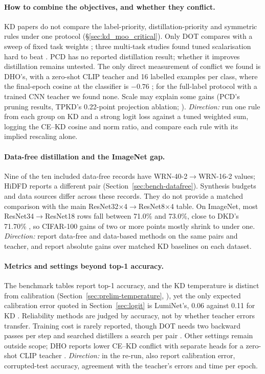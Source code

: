 \paragraph{How to combine the objectives, and whether they conflict.}
KD papers do not compare the label-priority, distillation-priority and symmetric rules under one protocol (\S\ref{sec:kd_moo_critical}). Only DOT compares with a sweep of fixed task weights \citep{zhao2023dot}; three multi-task studies found tuned scalarisation hard to beat
\citep{xin2022mtohelp,kurin2022unitary,royer2023scalarization}. PCD \citep{varam2026pcd} has no reported
distillation result; whether it improves distillation remains untested. The only direct measurement of conflict we found is DHO's, with a zero-shot CLIP teacher and 16
labelled examples per class, where the final-epoch cosine at the classifier is $-0.76$ \citep{kang2025dho}; for
the full-label protocol with a trained CNN teacher we found none. Scale may explain some gains (PCD's pruning results, TPKD's 0.22-point projection ablation; \citealp{varam2026pcd,yuan2026tpkd}).
\emph{Direction:} run one rule from each group on KD and a strong logit loss against a tuned weighted sum,
logging the CE--KD cosine and norm ratio, and compare each rule with its implied rescaling alone.

\paragraph{Data-free distillation and the ImageNet gap.}
Nine of the ten included data-free records have WRN-40-2$\to$WRN-16-2 values; HiDFD reports a different pair (Section~\ref{sec:bench-datafree}). Synthesis budgets and data sources differ across these records. They do not provide a matched comparison with the main ResNet32$\times$4$\to$ResNet8$\times$4 table. On ImageNet, most ResNet34$\to$ResNet18 rows fall between 71.0\% and 73.0\%,
close to DKD's 71.70\% \citep{zhao2023dot}, so CIFAR-100 gains of two or more points mostly shrink to under one.
\emph{Direction:} report data-free and data-based methods on the same pairs and teacher, and report absolute gains over matched KD baselines on each dataset.

\paragraph{Metrics and settings beyond top-1 accuracy.}
The benchmark tables report top-1 accuracy, and the KD temperature is distinct from calibration (Section~\ref{sec:prelim-temperature}, \citealp{guo2017calibration}), yet the only expected calibration error quoted in
Section~\ref{sec:logit} is LumiNet's, 0.06 against 0.11 for KD \citep{hossain2025luminet}. Reliability methods are judged by accuracy, not by whether teacher errors transfer. Training cost is rarely reported, though DOT needs two backward passes per step and searched
distillers a search per pair \citep{zhao2023dot}.
\label{sec:emerging}Other settings remain outside scope; DHO reports lower CE--KD conflict with separate heads for a zero-shot CLIP teacher \citep{kang2025dho}.
\emph{Direction:} in the re-run, also report calibration error, corrupted-test accuracy, agreement with
the teacher's errors and time per epoch.

